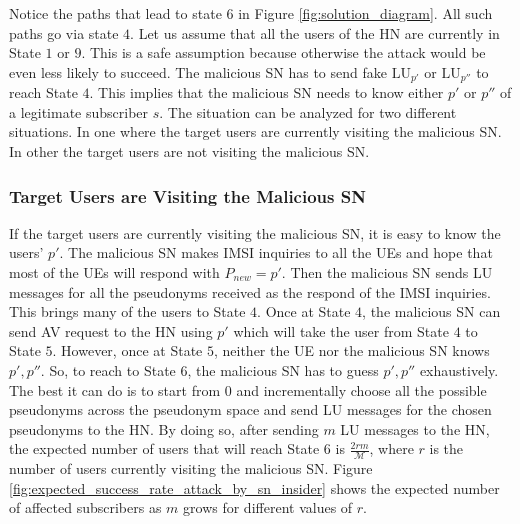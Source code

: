\documentclass{llncs} %
\begin{document}
Notice the paths that lead to state $6$ in Figure \ref{fig:solution_diagram}. All such paths go via state $4$. Let us assume that all the users of the HN are currently in State $1$ or $9$. This is a safe assumption because otherwise the attack would be even less likely to succeed. The malicious SN has to send fake $\text{LU}_{p'}$ or $\text{LU}_{p''}$ to reach State $4$. This implies that the malicious SN needs to know either $p'$ or $p''$ of a legitimate subscriber $s$. The situation can be analyzed for two different situations. In one where the target users are currently visiting the malicious SN. In other the target users are not visiting the malicious SN.

\subsubsection{Target Users are Visiting the Malicious SN} If the target users are currently visiting the malicious SN, it is easy to know the users' $p'$. The malicious SN makes IMSI inquiries to all the UEs and hope that most of the UEs will respond with $P_{new} = p'$. Then the malicious SN sends LU messages for all the pseudonyms received as the respond of the IMSI inquiries. This brings many of the users to State $4$.  Once at State $4$, the malicious SN can send AV request to the HN using $p'$ which will take the user from State $4$ to State $5$. However, once at State $5$, neither the UE nor the malicious SN knows $p',p''$. So, to reach to State $6$, the malicious SN has to guess $p',p''$ exhaustively. The best it can do is to start from $0$ and incrementally choose all the possible pseudonyms across the pseudonym space and send LU messages for the chosen pseudonyms to the HN. By doing so, after sending $m$ LU messages to the HN, the expected number of users that will reach State $6$ is $\frac{2rm}{\mathcal{M}}$, where $r$ is the number of users currently visiting the malicious SN. Figure \ref{fig:expected_success_rate_attack_by_sn_insider} shows the expected number of affected subscribers as $m$ grows for different values of $r$.
\end{document}
